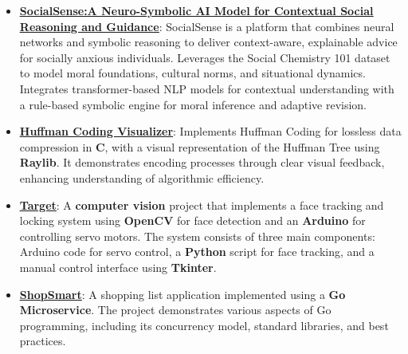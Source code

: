 \documentclass[a4paper,10.5pt]{article}
\begin{document}
\begin{itemize}
    \item \textbf{\href{https://excalidraw.com/\#json=3GJJjDDzww13jjwMov6in,dotekxmLzc74PICs-tpmDQ}{\underline{SocialSense:A Neuro-Symbolic AI Model for Contextual Social Reasoning and Guidance}}}: SocialSense is a platform that combines neural networks and symbolic reasoning to deliver context-aware, explainable advice for socially anxious individuals. Leverages the Social Chemistry 101 dataset to model moral foundations, cultural norms, and situational dynamics. Integrates transformer-based NLP models for contextual understanding with a rule-based symbolic engine for moral inference and adaptive revision.
    \item \textbf{\href{https://github.com/thearfa99/huft}{\underline{Huffman Coding Visualizer}}}: Implements Huffman Coding for lossless data compression in \textbf{C}, with a visual representation of the Huffman Tree using \textbf{Raylib}. It demonstrates encoding processes through clear visual feedback, enhancing understanding of algorithmic efficiency.
    \item \textbf{\href{https://github.com/thearfa99/tureet}{\underline{Target}}}: A \textbf{computer vision} project that implements a face tracking and locking system using \textbf{OpenCV} for face detection and an \textbf{Arduino} for controlling servo motors. The system consists of three main components: Arduino code for servo control, a \textbf{Python} script for face tracking, and a manual control interface using \textbf{Tkinter}.
    \item \textbf{\href{https://github.com/thearfa99/ShopSmart}{\underline{ShopSmart}}}: A shopping list application implemented using a \textbf{Go Microservice}. The project demonstrates various aspects of Go programming, including its concurrency model, standard libraries, and best practices.
\end{itemize}
\end{document}

